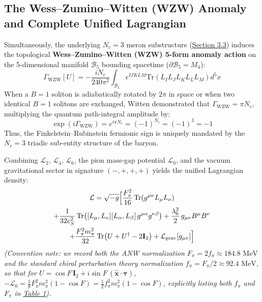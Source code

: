 \documentclass[10pt,aps,prd,twocolumn,superscriptaddress,nofootinbib,floatfix,longbibliography,showkeys]{revtex4-2}
\begin{document}
\subsection{The Wess--Zumino--Witten (WZW) Anomaly and Complete Unified Lagrangian}\label{sec:2.3}

Simultaneously, the underlying $N_c = 3$ meron substructure (\hyperref[sec:3.3]{Section 3.3}) induces the topological \textbf{Wess--Zumino--Witten (WZW) 5-form anomaly action} \cite{ref4,ref5} on the 5-dimensional manifold $\mathcal{B}_5$ bounding spacetime ($\partial \mathcal{B}_5 = M_4$):
\begin{equation}
\Gamma_{\text{WZW}}[U] = -\frac{i N_c}{240\pi^2}\!\int_{\mathcal{B}_5}\!\epsilon^{IJKLM}\text{Tr}\!\left(L_I L_J L_K L_L L_M\right) d^5x
\end{equation}
When a $B=1$ soliton is adiabatically rotated by $2\pi$ in space or when two identical $B=1$ solitons are exchanged, Witten demonstrated \cite{ref4,ref5} that $\Gamma_{\text{WZW}} = \pi N_c$, multiplying the quantum path-integral amplitude by:
\begin{equation}
\exp\!\left(i \Gamma_{\text{WZW}}\right) = e^{i \pi N_c} = (-1)^{N_c} = (-1)^3 = -1
\end{equation}
Thus, the Finkelstein--Rubinstein fermionic sign is uniquely mandated by the $N_c = 3$ triadic sub-entity structure of the baryon.

Combining $\mathcal{L}_2$, $\mathcal{L}_4$, $\mathcal{L}_6$, the pion mass-gap potential $\mathcal{L}_0$, and the vacuum gravitational sector in signature $(-,+,+,+)$ yields the unified Lagrangian density:
\begin{multline}
\mathcal{L} = \sqrt{-g}\Bigl[ \frac{F_\pi^2}{16}\,\text{Tr}\!\left(g^{\mu\nu} L_\mu L_\nu\right) \\
+ \frac{1}{32 e_S^2}\,\text{Tr}\!\left([L_\mu, L_\nu][L_\alpha, L_\beta]\,g^{\mu\alpha} g^{\nu\beta}\right) + \frac{\lambda_6^2}{2}\,g_{\mu\nu}B^\mu B^\nu \\
+ \frac{F_\pi^2 m_\pi^2}{32}\,\text{Tr}\!\left(U + U^\dagger - 2\mathbf{I}_2\right) + \mathcal{L}_{\text{grav}}[g_{\mu\nu}] \Bigr]
\end{multline}
\textit{(Convention note: we record both the ANW normalization $F_\pi = 2 f_\pi \approx 184.8\text{ MeV}$ \cite{ref43} and the standard chiral perturbation theory normalization $f_\pi = F_\pi/2 \approx 92.4\text{ MeV}$, so that for $U = \cos F\,\mathbf{I}_2 + i\sin F\,(\hat{\mathbf{x}}\cdot\boldsymbol{\tau})$, $-\mathcal{L}_0 = \frac{1}{8}F_\pi^2 m_\pi^2(1 - \cos F) = \frac{1}{2}f_\pi^2 m_\pi^2(1 - \cos F)$, explicitly listing both $f_\pi$ and $F_\pi$ in \hyperref[tab:table1]{Table 1}).}
\end{document}
